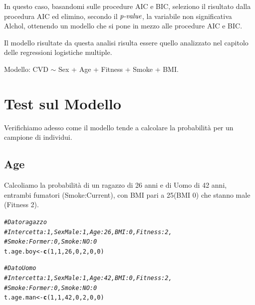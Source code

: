 \documentclass{article}\usepackage[]{graphicx}\usepackage[]{xcolor}
\makeatletter
\newcommand{\hlnum}[1]{\textcolor[rgb]{0.686,0.059,0.569}{#1}}%
\newcommand{\hlcom}[1]{\textcolor[rgb]{0.678,0.584,0.686}{\textit{#1}}}%
\newcommand{\hlstd}[1]{\textcolor[rgb]{0.345,0.345,0.345}{#1}}%
\newcommand{\hlkwb}[1]{\textcolor[rgb]{0.69,0.353,0.396}{#1}}%
\newcommand{\hlkwd}[1]{\textcolor[rgb]{0.737,0.353,0.396}{\textbf{#1}}}%
\newenvironment{kframe}{%
 \def\at@end@of@kframe{}%
 \ifinner\ifhmode%
  \def\at@end@of@kframe{\end{minipage}}%
  \begin{minipage}{\columnwidth}%
 \fi\fi%
 \def\FrameCommand##1{\hskip\@totalleftmargin \hskip-\fboxsep
 \colorbox{shadecolor}{##1}\hskip-\fboxsep
     \hskip-\linewidth \hskip-\@totalleftmargin \hskip\columnwidth}%
 \MakeFramed {\advance\hsize-\width
   \@totalleftmargin\z@ \linewidth\hsize
   \@setminipage}}%
 {\par\unskip\endMakeFramed%
 \at@end@of@kframe}
\newenvironment{knitrout}{}{} %
\makeatother
\begin{document}
      In questo caso, basandomi sulle procedure AIC e BIC, 
      seleziono il risultato dalla procedura AIC ed elimino, secondo il
      $\emph{p-value}$, la variabile non significativa Alchol, ottenendo un modello
      che si pone in mezzo alle procedure AIC e BIC. \par
      Il modello risultate da questa analisi risulta essere quello analizzato
      nel capitolo delle regressioni logistiche multiple. \par
      Modello: CVD $\sim$ Sex + Age + Fitness + Smoke + BMI. \par

\clearpage


\section{Test sul Modello}
  Verifichiamo adesso come il modello tende a calcolare la probabilità per un         campione di individui.
  
  \subsection{Age}
    Calcoliamo la probabilità di un ragazzo di 26 anni e di Uomo di 42 anni, 
    entrambi fumatori (Smoke:Current), con BMI pari a 25(BMI 0) che stanno male 
    (Fitness 2).
      
\begin{knitrout}
\color{fgcolor}\begin{kframe}
\begin{alltt}
\hlcom{#Dato ragazzo}
\hlcom{#Intercetta: 1, SexMale: 1, Age: 26, BMI: 0, Fitness: 2, }
\hlcom{#Smoke:Former: 0, Smoke:NO: 0 }
\hlstd{t.age.boy} \hlkwb{<-} \hlkwd{c}\hlstd{(}\hlnum{1}\hlstd{,} \hlnum{1}\hlstd{,} \hlnum{26}\hlstd{,} \hlnum{0}\hlstd{,} \hlnum{2}\hlstd{,} \hlnum{0}\hlstd{,} \hlnum{0}\hlstd{)}

\hlcom{#Dato Uomo}
\hlcom{#Intercetta: 1, SexMale: 1, Age: 42, BMI: 0, Fitness: 2, }
\hlcom{#Smoke:Former: 0, Smoke:NO: 0 }
\hlstd{t.age.man} \hlkwb{<-} \hlkwd{c}\hlstd{(}\hlnum{1}\hlstd{,} \hlnum{1}\hlstd{,} \hlnum{42}\hlstd{,} \hlnum{0}\hlstd{,} \hlnum{2}\hlstd{,} \hlnum{0}\hlstd{,} \hlnum{0}\hlstd{)}
\end{alltt}
\end{kframe}
\end{knitrout}
    
\end{document}
